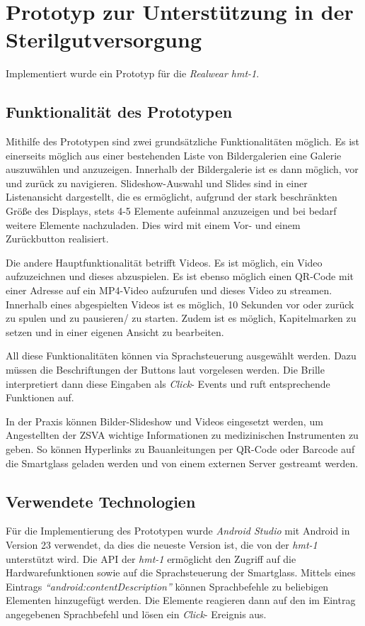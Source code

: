 %
%
%
%
%
%
\chapter{Prototyp zur Unterstützung in der Sterilgutversorgung}
\label{ch:Prototyp}
Implementiert wurde ein Prototyp für die \emph{Realwear hmt-1}. 
%
%
\section{Funktionalität des Prototypen}
Mithilfe des Prototypen sind zwei grundsätzliche Funktionalitäten möglich. Es ist einerseits möglich aus einer bestehenden Liste von Bildergalerien eine Galerie auszuwählen und anzuzeigen. Innerhalb der Bildergalerie ist es dann möglich, vor und zurück zu navigieren. Slideshow-Auswahl und Slides sind in einer Listenansicht dargestellt, die es ermöglicht, aufgrund der stark beschränkten Größe des Displays, stets 4-5 Elemente aufeinmal anzuzeigen und bei bedarf weitere Elemente nachzuladen. Dies wird mit einem Vor- und einem Zurückbutton realisiert.

Die andere Hauptfunktionalität betrifft Videos. Es ist möglich, ein Video aufzuzeichnen und dieses abzuspielen. Es ist ebenso möglich einen QR-Code mit einer Adresse auf ein MP4-Video aufzurufen und dieses Video zu streamen. Innerhalb eines abgespielten Videos ist es möglich, 10 Sekunden vor oder zurück zu spulen und zu pausieren/ zu starten. Zudem ist es möglich, Kapitelmarken zu setzen und in einer eigenen Ansicht zu bearbeiten.

All diese Funktionalitäten können via Sprachsteuerung ausgewählt werden. Dazu müssen die Beschriftungen der Buttons laut vorgelesen werden. Die Brille interpretiert dann diese Eingaben als \emph{Click}- Events und ruft entsprechende Funktionen auf.

In der Praxis können Bilder-Slideshow und Videos eingesetzt werden, um Angestellten der ZSVA wichtige Informationen zu medizinischen Instrumenten zu geben. So können Hyperlinks zu Bauanleitungen per QR-Code oder Barcode auf die Smartglass geladen werden und von einem externen Server gestreamt werden.
%
%
%
%
%
%
\section{Verwendete Technologien}
\label{sec:Verwendete_Technologien}
Für die Implementierung des Prototypen wurde \emph{Android Studio} mit Android in Version 23 verwendet, da dies die neueste Version ist, die von der \emph{hmt-1} unterstützt wird. Die API der \emph{hmt-1} ermöglicht den Zugriff auf die Hardwarefunktionen sowie auf die Sprachsteuerung der Smartglass. Mittels eines Eintrags \emph{\enquote{android:contentDescription}} können Sprachbefehle zu beliebigen Elementen hinzugefügt werden. Die Elemente reagieren dann auf den im Eintrag angegebenen Sprachbefehl und lösen ein \emph{Click}- Ereignis aus.

